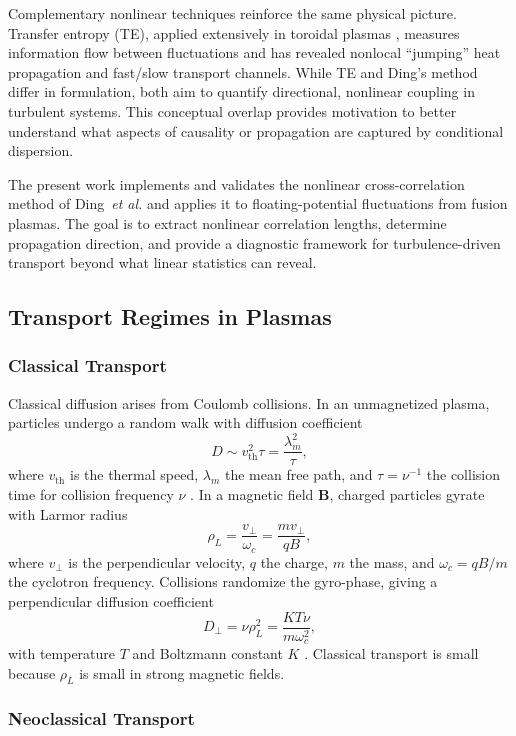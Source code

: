 \documentclass[12pt]{article}
\begin{document}
Complementary nonlinear techniques reinforce the same physical picture. Transfer entropy (TE),
applied extensively in toroidal plasmas \cite{vanmilligenCausalityDetectionTurbulence2013,
vanmilligenRadialPropagationHeat2019}, measures information flow between fluctuations and has
revealed nonlocal ``jumping'' heat propagation and fast/slow transport channels. While TE and
Ding's method differ in formulation, both aim to quantify directional, nonlinear coupling in
turbulent systems. This conceptual overlap provides motivation to better understand what aspects
of causality or propagation are captured by conditional dispersion.

The present work implements and validates the nonlinear cross-correlation method of
Ding~\textit{et al.} and applies it to floating-potential fluctuations from fusion plasmas.
The goal is to extract nonlinear correlation lengths, determine propagation direction, and provide
a diagnostic framework for turbulence-driven transport beyond what linear statistics can reveal.

\subsection{Transport Regimes in Plasmas}

\subsubsection*{Classical Transport}

Classical diffusion arises from Coulomb collisions. In an unmagnetized plasma, particles undergo a
random walk with diffusion coefficient
\[
D \sim v_{\mathrm{th}}^{2}\tau = \frac{\lambda_m^{2}}{\tau},
\]
where $v_{\mathrm{th}}$ is the thermal speed, $\lambda_m$ the mean free path, and
$\tau = \nu^{-1}$ the collision time for collision frequency $\nu$
\cite{chenIntroductionPlasmaPhysics2016}. In a magnetic field $\mathbf{B}$, charged particles gyrate
with Larmor radius
\[
\rho_L = \frac{v_\perp}{\omega_c} = \frac{m v_\perp}{q B},
\]
where $v_\perp$ is the perpendicular velocity, $q$ the charge, $m$ the mass, and
$\omega_c = qB/m$ the cyclotron frequency. Collisions randomize the gyro-phase, giving a
perpendicular diffusion coefficient
\[
D_{\perp} = \nu \rho_L^2 = \frac{K T \nu}{m\omega_c^2},
\]
with temperature $T$ and Boltzmann constant $K$
\cite[§5.5]{chenIntroductionPlasmaPhysics2016}.
Classical transport is small because $\rho_L$ is small in strong magnetic fields.

\subsubsection*{Neoclassical Transport}
\end{document}
